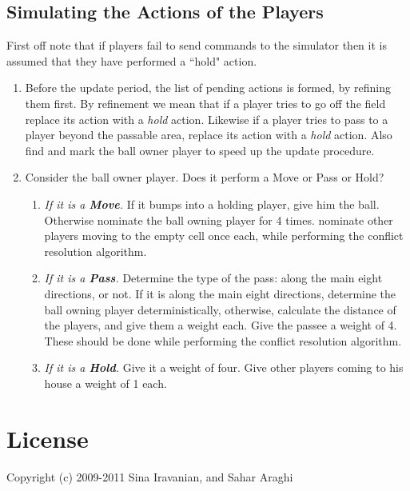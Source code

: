 \documentclass[12pt,titlepage,a4paper]{article}
\begin{document}
\subsection{Simulating the Actions of the Players}

First off note that if players fail to send commands to the simulator then it is assumed that they have performed a ``hold" action.

\begin{enumerate}
\item Before the update period, the list of pending actions is formed, by refining them first. By refinement we mean that if a player tries to go off the field replace its action with a \emph{hold} action. Likewise if a player tries to pass to a player beyond the passable area, replace its action with a \emph{hold} action. Also find and mark the ball owner player to speed up the update procedure.

\item Consider the ball owner player. Does it perform a Move or Pass or Hold? 

\begin{enumerate}
\item \emph{If it is a \textbf{Move}.} If it bumps into a holding player, give him the ball. Otherwise nominate the ball owning player for 4 times. nominate other players moving to the empty cell once each, while performing the conflict resolution algorithm.

\item \emph{If it is a \textbf{Pass}.} Determine the type of the pass: along the main eight directions, or not. If it is along the main eight directions, determine the ball owning player deterministically, otherwise, calculate the distance of the players, and give them a weight each. Give the passee a weight of 4. These should be done while performing the conflict resolution algorithm.

\item \emph{If it is a \textbf{Hold}.} Give it a weight of four. Give other players coming to his house a weight of 1 each.
\end{enumerate}
\end{enumerate}

\newpage
\appendix
\section{License}

\bigskip
Copyright (c) 2009-2011 Sina Iravanian, and Sahar Araghi
\end{document}
